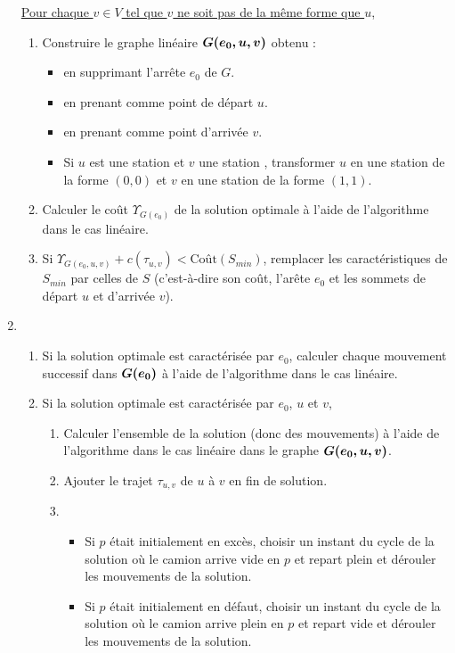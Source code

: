 \begin{enumerate}
  \uline{Pour chaque $v \in V$ tel que $v$ ne soit pas de la même forme que $u$},
  \begin{enumerate}
  \item Construire le graphe linéaire $\boldsymbol{G(e_0,u,v)}$ obtenu :
    \begin{itemize}
    \item en supprimant l'arrête $e_0$ de $G$.
    \item en prenant comme point de départ $u$.
    \item en prenant comme point d'arrivée $v$.
    \item Si $u$ est une station \plus et $v$ une station \moins, transformer $u$ en une station de la forme $(0,0)$ et $v$ en une station de la forme $(1,1)$.
    \end{itemize}
  \item Calculer le coût $\Upsilon_{G(e_0)}$ de la solution optimale à l'aide de l'algorithme dans le cas linéaire.
  \item Si $\Upsilon_{G(e_0,u,v)} + c(\tau_{u,v}) < \mbox{Coût}(S_{min})$, remplacer les caractéristiques de $S_{min}$ par celles de $S$ (c'est-à-dire son coût, l'arête $e_0$ et les sommets de départ $u$ et d'arrivée $v$).
  \end{enumerate}
\item \begin{enumerate}
\item Si la solution optimale est caractérisée par $e_0$, calculer chaque mouvement successif dans $\boldsymbol{G(e_0)}$ à l'aide de l'algorithme dans le cas linéaire.
  \item Si la solution optimale est caractérisée par $e_0$, $u$ et $v$, 
    \begin{enumerate}
    \item Calculer l'ensemble de la solution (donc des mouvements) à l'aide de l'algorithme dans le cas linéaire dans le graphe $\boldsymbol{G(e_0,u,v)}$.
    \item Ajouter le trajet $\tau_{u,v}$ de $u$ à $v$ en fin de solution.
    \item \begin{itemize}
      \item Si $p$ était initialement en excès, choisir un instant du cycle de la solution où le camion arrive vide en $p$ et repart plein et dérouler les mouvements de la solution.
      \item Si $p$ était initialement en défaut, choisir un instant du cycle de la solution où le camion arrive plein en $p$ et repart vide et dérouler les mouvements de la solution.
      \end{itemize}
    \end{enumerate}
  \end{enumerate}
\end{enumerate}


